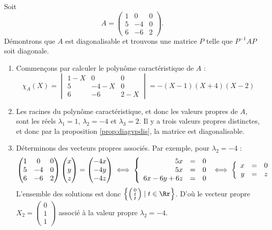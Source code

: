 \documentclass[11pt, class=report,crop=false]{standalone}
\begin{document}
\begin{exemple}
Soit 
$$A=
\begin{pmatrix}
1 & 0 & 0 \\
5 & -4 & 0 \\
6 & -6 & 2
\end{pmatrix}.$$
Démontrons que $A$ est diagonalisable et trouvons une matrice $P$ telle que $P^{-1}AP$ soit diagonale.


\begin{enumerate}
  \item Commençons par calculer le polynôme caractéristique de $A$ :
$$\chi_A(X)=\begin{vmatrix}
1-X & 0 & 0 \\
5 & -4-X & 0 \\
6 & -6 & 2-X
\end{vmatrix}
=-(X-1)(X+4)(X-2)$$


  \item Les racines du polynôme caractéristique, et donc les valeurs propres de $A$, sont les réels 
  $\lambda_1 = 1$, $\lambda_2 = -4$ et $\lambda_3 = 2$. Il y a trois valeurs propres distinctes, et donc par la proposition \ref{prop:diagvpdis}, la matrice est diagonalisable.
  
  \item  Déterminons des vecteurs propres associés.
Par exemple, pour $\lambda_2 = -4$ :
$$\begin{pmatrix}
1 & 0 & 0 \\
5 & -4 & 0 \\
6 & -6 & 2
\cr\end{pmatrix}\begin{pmatrix}x\cr y \cr z\end{pmatrix}=
\begin{pmatrix}-4x\cr -4y \cr -4z\end{pmatrix}
\iff 
\left\{ 
\begin{array}{rcl}
5x &=& 0 \\
5x &=& 0 \\
6x-6y+6z &=& 0 \\ 
\end{array}
\right.
\iff 
\left\{ 
\begin{array}{rcl}
x &=& 0 \\
y &=& z \\ 
\end{array}
\right.$$
L'ensemble des solutions est donc 
$\left\{ \left(\begin{smallmatrix}0\\t\\t\end{smallmatrix}\right) \mid t \in \Rr \right\}$.
D'où le vecteur propre $X_2=\left(\begin{smallmatrix}0\\1\\1\end{smallmatrix}\right)$ associé à la valeur propre $\lambda_2=-4$.   
  

\end{enumerate}
\end{exemple}
\end{document}
